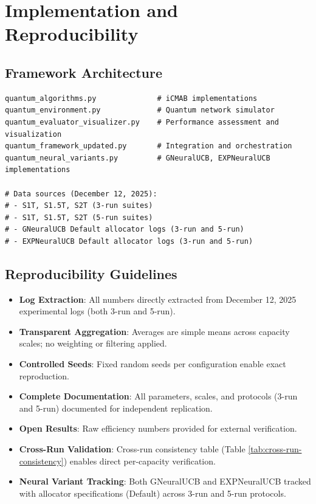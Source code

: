 \documentclass[12pt,a4paper]{article}
\begin{document}
\section{Implementation and Reproducibility}

\subsection{Framework Architecture}
\begin{lstlisting}[caption=Core iCMAB and Neural Framework Components]
quantum_algorithms.py              # iCMAB implementations
quantum_environment.py             # Quantum network simulator
quantum_evaluator_visualizer.py    # Performance assessment and visualization
quantum_framework_updated.py       # Integration and orchestration
quantum_neural_variants.py         # GNeuralUCB, EXPNeuralUCB implementations

# Data sources (December 12, 2025):
# - S1T, S1.5T, S2T (3-run suites)
# - S1T, S1.5T, S2T (5-run suites)
# - GNeuralUCB Default allocator logs (3-run and 5-run)
# - EXPNeuralUCB Default allocator logs (3-run and 5-run)
\end{lstlisting}

\subsection{Reproducibility Guidelines}
\begin{itemize}
\item \textbf{Log Extraction}: All numbers directly extracted from December 12, 2025 experimental logs (both 3-run and 5-run).
\item \textbf{Transparent Aggregation}: Averages are simple means across capacity scales; no weighting or filtering applied.
\item \textbf{Controlled Seeds}: Fixed random seeds per configuration enable exact reproduction.
\item \textbf{Complete Documentation}: All parameters, scales, and protocols (3-run and 5-run) documented for independent replication.
\item \textbf{Open Results}: Raw efficiency numbers provided for external verification.
\item \textbf{Cross-Run Validation}: Cross-run consistency table (Table \ref{tab:cross-run-consistency}) enables direct per-capacity verification.
\item \textbf{Neural Variant Tracking}: Both GNeuralUCB and EXPNeuralUCB tracked with allocator specifications (Default) across 3-run and 5-run protocols.
\end{itemize}
\end{document}
